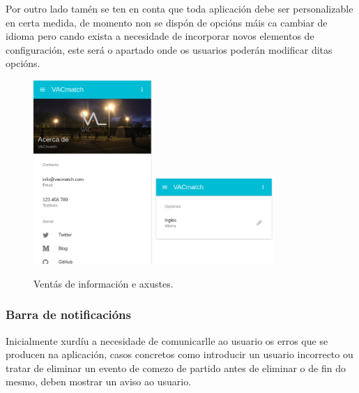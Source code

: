       Por outro lado tamén se ten en conta que toda aplicación debe ser 
personalizable en certa medida, de momento non se dispón de opcións máis ca 
cambiar de idioma pero cando exista a necesidade de incorporar 
novos elementos de configuración, este será o apartado onde os usuarios poderán 
modificar ditas opcións.

      \begin{figure}[h!]
        \begin{center}
        \includegraphics[width=0.4\textwidth]{./img/demo/3_about.png}
        \includegraphics[width=0.4\textwidth]{./img/demo/4_settings.png}
        \caption{Ventás de información e axustes.}
        \label{fig:design:settings}
        \end{center}
      \end{figure}

      \subsubsection{Barra de notificacións}
      Inicialmente xurdíu a necesidade de comunicarlle ao usuario os erros que 
se producen na aplicación, casos concretos como introducir un usuario 
incorrecto ou tratar de eliminar un evento de comezo de partido antes de 
eliminar o de fin do mesmo, deben mostrar un aviso ao usuario.

